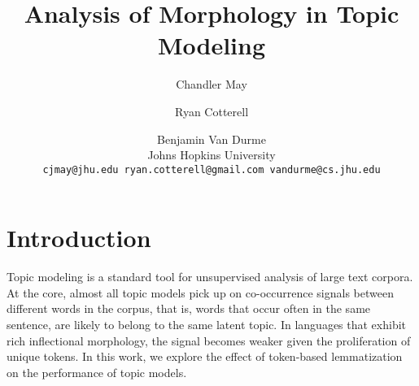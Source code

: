 \documentclass[11pt,letterpaper]{article}
\title{Analysis of Morphology in Topic Modeling}
\author{Chandler May \and Ryan Cotterell \and Benjamin Van Durme \\
    Johns Hopkins University \\
    \texttt{cjmay@jhu.edu ryan.cotterell@gmail.com
    vandurme@cs.jhu.edu}}
\date{}
\begin{document}
\maketitle

\begin{abstract}
    
\end{abstract}


\section{Introduction}\label{sec:introduction}

Topic modeling is a standard tool for unsupervised analysis of large
text corpora. At the core, almost all topic models pick up on
co-occurrence signals between different words in the corpus, that is,
words that occur often in the same sentence, are likely to belong to
the same latent topic. In languages that exhibit rich inflectional
morphology, the signal becomes weaker given the proliferation of
unique tokens. In this work, we explore the effect of token-based
lemmatization on the performance of topic models.
\end{document}

